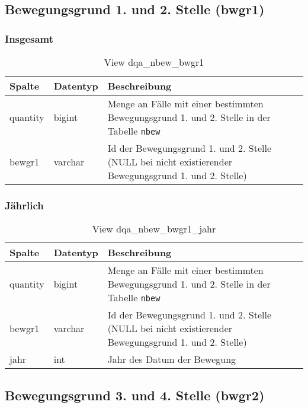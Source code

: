 \subsection{Bewegungsgrund 1. und 2. Stelle (bwgr1)} \label{subsec:bewgr1}

\subsubsection{Insgesamt} \label{subsubsec:bewg1I}

\begin{table}[ht]
	\centering   
	\caption{View dqa\_nbew\_bwgr1}
	\label{tab:bewG1I}
	\begin{tabular}{||l|l|p{10cm}||}   		
		\hline
		Spalte & Datentyp & Beschreibung \\ [0.5ex]
		\hline\hline
		quantity & bigint & Menge an Fälle mit einer bestimmten Bewegungsgrund 1. und 2. Stelle in der Tabelle \texttt{nbew} \\
		\hline
		bewgr1 & varchar & Id der Bewegungsgrund 1. und 2. Stelle (NULL bei nicht existierender Bewegungsgrund 1. und 2. Stelle)\\
		\hline
		
	\end{tabular}
\end{table}


\subsubsection{Jährlich} \label{subsubsec:bewg1J}

\begin{table}[ht]
	\centering   
	\caption{View dqa\_nbew\_bwgr1\_jahr}
	\label{tab:bewG1J}
	\begin{tabular}{||l|l|p{10cm}||}   		
		\hline
		Spalte & Datentyp & Beschreibung \\ [0.5ex]
		\hline\hline
		quantity & bigint & Menge an Fälle mit einer bestimmten Bewegungsgrund 1. und 2. Stelle in der Tabelle \texttt{nbew}\\
		\hline
		bewgr1 & varchar & Id der Bewegungsgrund 1. und 2. Stelle (NULL bei nicht existierender Bewegungsgrund 1. und 2. Stelle)\\
		\hline
		jahr & int &  Jahr des Datum der Bewegung \\
		\hline		
	\end{tabular}
\end{table}

\subsection{Bewegungsgrund 3. und 4. Stelle (bwgr2)} \label{subsec:bewgr2}

